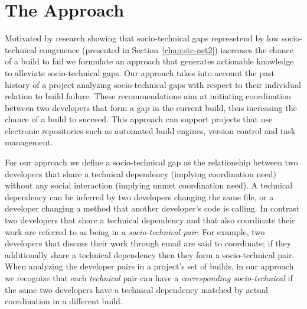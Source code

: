 \section{The Approach}
\label{chap:approach}
Motivated by research showing that socio-technical gaps represetend by low socio-technical congruence (presented in Section~\ref{chap:stc-net2}) increases the chance of a build to fail we formulate an approach that generates actionable knowledge to alleviate socio-technical gaps.
Our approach takes into account the past history of a project analyzing socio-technical gaps with respect to their individual relation to build failure.
These recommendations aim at initiating coordination between two developers that form a gap in the current build, thus increasing the chance of a build to succeed.
This approach can support projects that use electronic repositories such as automated build engines, version control and task management.

For our approach we define a socio-technical gap as the relationship between two developers that share a technical dependency (implying coordination need) without any social interaction (implying unmet coordination need).
A technical dependency can be inferred by two developers changing the same file, or a developer changing a method that another developer's code is calling.
In contrast two developers that share a technical dependency and that also coordinate their work are referred to as being in a \emph{socio-technical pair}.
For example, two developers that discuss their work through email are said to coordinate; if they additionally share a technical dependency then they form a socio-technical pair.
%
When analyzing the developer pairs in a project's set of builds, in our approach we recognize that each \emph{technical} pair can have a \emph{corresponding socio-technical} if the same two developers have a technical dependency matched by actual coordination in a different build. 


